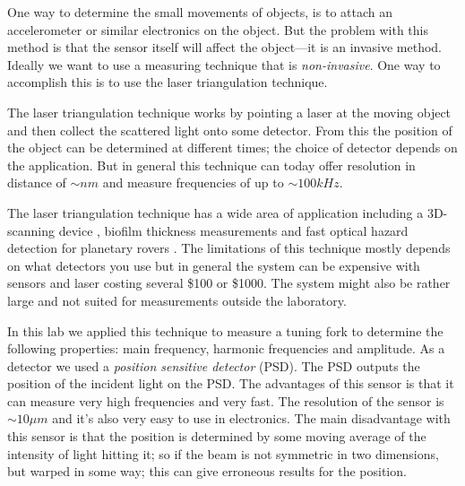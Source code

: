One way to determine the small movements of objects, is to attach an accelerometer or similar 
electronics on the object. 
But the problem with this method is that the sensor itself will affect the object---it is an invasive method. Ideally we want to use a measuring technique that is \emph{non-invasive}.
One way to accomplish this is to use the laser triangulation technique.

The laser triangulation technique works by pointing a laser at the moving object and then collect the scattered light onto some detector. From this the position of the object can be determined at different times; the choice of detector depends on the application. 
But in general this technique can today offer resolution in distance of $\sim nm$ %
and measure frequencies of up to $\sim 100kHz$. %

The laser triangulation technique has a wide area of application
including a 3D-scanning device \cite{Franca05},
biofilm thickness measurements \cite{Okkerse00} and fast optical hazard detection for planetary rovers \cite{Matthies97}.
The limitations of this technique mostly depends on what detectors you use but in general the system
can be expensive with sensors and laser costing several \$100 or \$1000. The system might also be rather large and not suited for measurements outside the laboratory.

In this lab we applied this technique to measure a tuning fork to determine the following properties: main frequency, harmonic frequencies and amplitude.
As a detector we used a \emph{position sensitive detector} (PSD). The PSD outputs
the position of the incident light on the PSD.
The advantages of this sensor is that it can measure very high frequencies and very fast. The resolution of the sensor is $\sim 10\mu m$ and it's also very easy to use in electronics.%
The main disadvantage with this sensor is that the position is determined by some moving average of the intensity of light hitting it; so if the beam is not symmetric in two dimensions, but warped in some way; this can give erroneous results for the position.